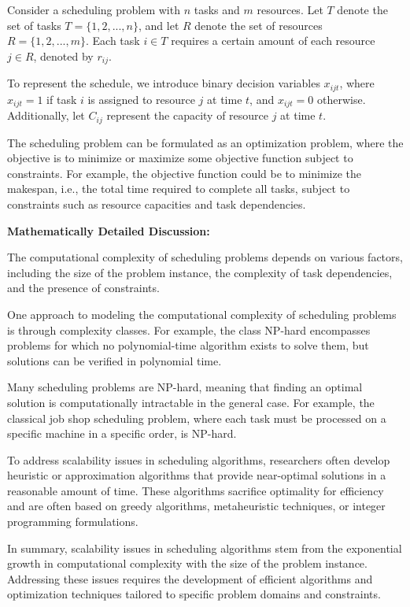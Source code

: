 \documentclass[12pt]{book} %
\begin{document}
Consider a scheduling problem with \(n\) tasks and \(m\) resources. Let \(T\) denote the set of tasks \(T = \{1, 2, ..., n\}\), and let \(R\) denote the set of resources \(R = \{1, 2, ..., m\}\). Each task \(i \in T\) requires a certain amount of each resource \(j \in R\), denoted by \(r_{ij}\).

To represent the schedule, we introduce binary decision variables \(x_{ijt}\), where \(x_{ijt} = 1\) if task \(i\) is assigned to resource \(j\) at time \(t\), and \(x_{ijt} = 0\) otherwise. Additionally, let \(C_{ij}\) represent the capacity of resource \(j\) at time \(t\).

The scheduling problem can be formulated as an optimization problem, where the objective is to minimize or maximize some objective function subject to constraints. For example, the objective function could be to minimize the makespan, i.e., the total time required to complete all tasks, subject to constraints such as resource capacities and task dependencies.

\textbf{Mathematically Detailed Discussion:}

The computational complexity of scheduling problems depends on various factors, including the size of the problem instance, the complexity of task dependencies, and the presence of constraints.

One approach to modeling the computational complexity of scheduling problems is through complexity classes. For example, the class NP-hard encompasses problems for which no polynomial-time algorithm exists to solve them, but solutions can be verified in polynomial time.

Many scheduling problems are NP-hard, meaning that finding an optimal solution is computationally intractable in the general case. For example, the classical job shop scheduling problem, where each task must be processed on a specific machine in a specific order, is NP-hard.

To address scalability issues in scheduling algorithms, researchers often develop heuristic or approximation algorithms that provide near-optimal solutions in a reasonable amount of time. These algorithms sacrifice optimality for efficiency and are often based on greedy algorithms, metaheuristic techniques, or integer programming formulations.

In summary, scalability issues in scheduling algorithms stem from the exponential growth in computational complexity with the size of the problem instance. Addressing these issues requires the development of efficient algorithms and optimization techniques tailored to specific problem domains and constraints.
\end{document}
